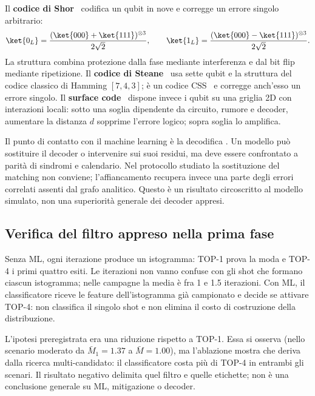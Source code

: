 Il \textbf{codice di Shor}~\cite{shorcorrection1995} codifica un qubit in nove
e corregge un errore singolo arbitrario:
\begin{equation}
 \ket{0_L}=\frac{(\ket{000}+\ket{111})^{\otimes3}}{2\sqrt2},\qquad
 \ket{1_L}=\frac{(\ket{000}-\ket{111})^{\otimes3}}{2\sqrt2}.
\end{equation}
La struttura combina protezione dalla fase mediante interferenza e dal bit flip
mediante ripetizione. Il \textbf{codice di Steane}~\cite{steane1996} usa sette
qubit e la struttura del codice classico di Hamming $[7,4,3]$; è un codice
\ac{CSS}~\cite{calderbankShor1996} e corregge anch'esso un errore singolo. Il
\textbf{surface code}~\cite{fowler2012} dispone invece i qubit su una griglia
2D con interazioni locali: sotto una soglia dipendente da circuito, rumore e
decoder, aumentare la distanza $d$ sopprime l'errore logico; sopra soglia lo
amplifica.

Il punto di contatto con il machine learning è la decodifica
\cite{torlaiMelko2017,alphaqubit2024}. Un modello può sostituire il decoder o
intervenire sui suoi residui, ma deve essere confrontato a parità di sindromi e
calendario. Nel protocollo studiato la sostituzione del matching non conviene;
l'affiancamento recupera invece una parte degli errori correlati assenti dal
grafo analitico. Questo è un risultato circoscritto al modello simulato, non una
superiorità generale dei decoder appresi.

\subsection{Verifica del filtro appreso nella prima fase}

Senza ML, ogni iterazione produce un istogramma: TOP-1 prova la moda e TOP-4 i
primi quattro esiti. Le iterazioni non vanno confuse con gli shot che formano
ciascun istogramma; nelle campagne la media è fra 1 e 1.5 iterazioni. Con ML,
il classificatore riceve le feature dell'istogramma già campionato e decide se
attivare TOP-4: non classifica il singolo shot e non elimina il costo di
costruzione della distribuzione.

L'ipotesi preregistrata era una riduzione rispetto a TOP-1. Essa si osserva
(nello scenario moderato da $\bar M_1=1.37$ a $\bar M=1.00$), ma l'ablazione
mostra che deriva dalla ricerca multi-candidato: il classificatore costa più di
TOP-4 in entrambi gli scenari. Il risultato negativo delimita quel filtro e
quelle etichette; non è una conclusione generale su ML, mitigazione o decoder.

